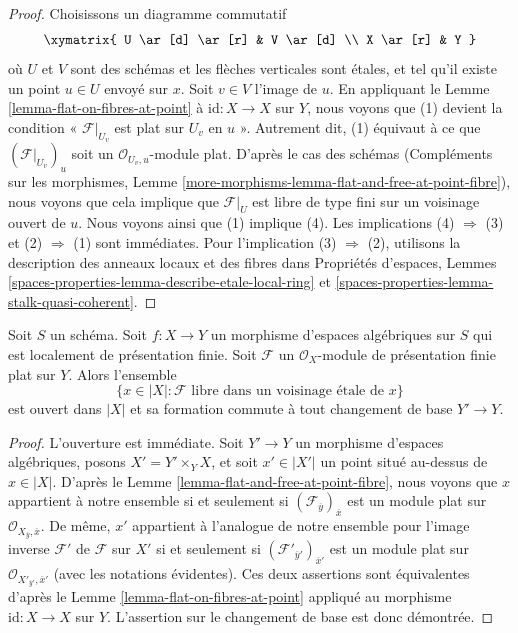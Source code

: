 \begin{proof}
Choisissons un diagramme commutatif
$$
\xymatrix{
U \ar[d] \ar[r] & V \ar[d] \\
X \ar[r] & Y
}
$$
où $U$ et $V$ sont des schémas et les flèches verticales sont étales,
et tel qu'il existe un point $u \in U$ envoyé sur $x$. Soit $v \in V$
l'image de $u$. En appliquant le Lemme \ref{lemma-flat-on-fibres-at-point}
à $\text{id} : X \to X$ sur $Y$, nous voyons que (1) devient
la condition « $\mathcal{F}|_{U_v}$ est plat sur $U_v$ en $u$ ».
Autrement dit, (1) équivaut à ce que $(\mathcal{F}|_{U_v})_u$
soit un $\mathcal{O}_{U_v, u}$-module plat.
D'après le cas des schémas (Compléments sur les morphismes, Lemme
\ref{more-morphisms-lemma-flat-and-free-at-point-fibre}),
nous voyons que cela implique que
$\mathcal{F}|_U$ est libre de type fini sur un voisinage ouvert
de $u$. Nous voyons ainsi que (1) implique (4).
Les implications (4) $\Rightarrow$ (3) et
(2) $\Rightarrow$ (1) sont immédiates.
Pour l'implication (3) $\Rightarrow$ (2), utilisons
la description des anneaux locaux et des fibres dans
Propriétés d'espaces, Lemmes
\ref{spaces-properties-lemma-describe-etale-local-ring} et
\ref{spaces-properties-lemma-stalk-quasi-coherent}.
\end{proof}

\begin{lemma}
\label{lemma-finite-free-open}
Soit $S$ un schéma. Soit $f : X \to Y$ un morphisme d'espaces algébriques
sur $S$ qui est localement de présentation finie.
Soit $\mathcal{F}$ un $\mathcal{O}_X$-module de présentation finie
plat sur $Y$. Alors l'ensemble
$$
\{x \in |X| : \mathcal{F}\text{ libre dans un voisinage étale de }x\}
$$
est ouvert dans $|X|$ et sa formation commute à tout changement de base
$Y' \to Y$.
\end{lemma}

\begin{proof}
L'ouverture est immédiate. Soit $Y' \to Y$ un morphisme d'espaces algébriques,
posons $X' = Y' \times_Y X$,
et soit $x' \in |X'|$ un point situé au-dessus de $x \in |X|$.
D'après le Lemme \ref{lemma-flat-and-free-at-point-fibre},
nous voyons que $x$ appartient à notre ensemble si et seulement si
$(\mathcal{F}_{\overline{y}})_{\overline{x}}$ est un module plat sur
$\mathcal{O}_{X_{\overline{y}}, \overline{x}}$.
De même, $x'$ appartient à l'analogue de notre ensemble pour l'image inverse
$\mathcal{F}'$ de $\mathcal{F}$ sur $X'$ si et seulement si
$(\mathcal{F}'_{\overline{y}'})_{\overline{x}'}$ est un module plat sur
$\mathcal{O}_{X'_{\overline{y}'}, \overline{x}'}$
(avec les notations évidentes). Ces deux assertions sont équivalentes
d'après le Lemme \ref{lemma-flat-on-fibres-at-point} appliqué au
morphisme $\text{id} : X \to X$ sur $Y$.
L'assertion sur le changement de base est donc démontrée.
\end{proof}







